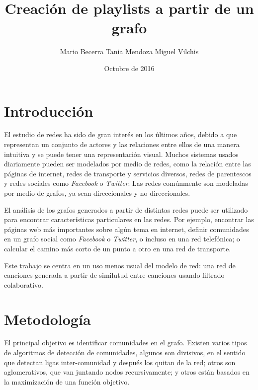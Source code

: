 \documentclass{article}
\begin{document}
\title{\vspace{-1cm}Creación de playlists a partir de un grafo}

\author{Mario Becerra \qquad Tania Mendoza \qquad Miguel Vilchis}

\date{Octubre de 2016}

\maketitle

\section{Introducción}

El estudio de redes ha sido de gran interés en los últimos años, debido a que representan un conjunto de actores y las relaciones entre ellos de una manera intuitiva y se puede tener una representación visual. Muchos sistemas usados diariamente pueden ser modelados por medio de redes, como la relación entre las páginas de internet, redes de transporte y servicios diversos, redes de parentescos y redes sociales como \textit{Facebook} o \textit{Twitter}.  Las redes comúnmente son modeladas por medio de grafos, ya sean direccionales y no direccionales. 

El análisis de los grafos generados a partir de distintas redes puede ser utilizado para encontrar características particulares en las redes. Por ejemplo, encontrar las páginas web más importantes sobre algún tema en internet, definir comunidades en un grafo social como \textit{Facebook} o \textit{Twitter}, o incluso en una red telefónica; o calcular el camino más corto de un punto a otro en una red de transporte.

Este trabajo se centra en un uso menos usual del modelo de red: una red de canciones generada a partir de similutud entre canciones usando filtrado colaborativo.

\section{Metodología}

El principal objetivo es identificar comunidades en el grafo. Existen varios tipos de algoritmos de detección de comunidades, algunos son divisivos, en el sentido que detectan ligas inter-comunidad y después los quitan de la red; otros son aglomerativos, que van juntando nodos recursivamente; y otros están basados en la maximización de una función objetivo.
\end{document}
